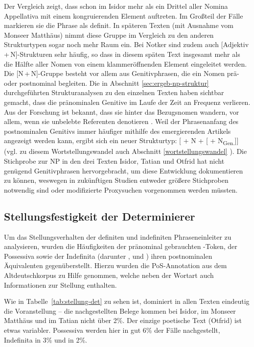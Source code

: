 Der Vergleich zeigt, dass schon im Isidor mehr als ein Drittel aller Nomina Appellativa mit einem kongruierenden Element auftreten. Im Großteil der Fälle markieren sie die Phrase als definit. In späteren Texten (mit Ausnahme vom Monseer Matthäus) nimmt diese Gruppe im Vergleich zu den anderen Strukturtypen sogar noch mehr Raum ein. Bei Notker sind zudem auch [Adjektiv\,+\,N]-Strukturen sehr häufig, so dass in diesem späten Text insgesamt mehr als die Hälfte aller Nomen von einem  klammeröffnenden Element eingeleitet werden. Die [N\,+\,N]-Gruppe besteht vor allem aus Genitivphrasen, die ein Nomen prä- oder postnominal begleiten. Die in Abschnitt \ref{sec:ergeb-np-struktur} durchgeführten Strukturanalysen zu den einzelnen Texten haben sichtbar gemacht, dass die pränominalen Genitive im Laufe der Zeit an Frequenz verlieren. Aus der Forschung ist bekannt, dass sie hinter das Bezugsnomen wandern, vor allem, wenn sie unbelebte Referenten denotieren \parencite{Demske2001}. Weil der Phrasenanfang des postnominalen Genitivs immer häufiger mithilfe des emergierenden Artikels angezeigt werden kann, ergibt sich ein neuer Strukturtyp: [ + N + [ + N\textsubscript{Gen.}]] (vgl. zu diesem Wortstellungswandel auch Abschnitt \ref{wortstellungswandel} ). Die Stichprobe zur NP in den drei Texten Isidor, Tatian und Otfrid hat nicht genügend Genitivphrasen hervorgebracht, um diese Entwicklung dokumentieren zu können, weswegen in zukünftigen Studien entweder größere Stichproben notwendig sind oder modifizierte Proxysuchen vorgenommen werden müssten.   


\subsection{Stellungsfestigkeit der Determinierer} \label{sec:ergebnisse-stellung}

Um das Stellungsverhalten der definiten und indefiniten Phraseneinleiter zu analysieren, wurden die Häufigkeiten der pränominal gebrauchten -Token, der Possessiva sowie der Indefinita (darunter ,  und ) ihren postnominalen Äquivalenten gegenüberstellt. Hierzu wurden die PoS-Annotation aus dem Altdeutschkorpus zu Hilfe genommen, welche neben der Wortart auch Informationen zur Stellung enthalten. 

Wie in Tabelle~\ref{tab:stellung-det} zu sehen ist, dominiert in allen Texten eindeutig die Voranstellung -- die nachgestellten Belege kommen bei Isidor, im Monseer Matthäus und im Tatian nicht über 2\%. Der einzige poetische Text (Otfrid) ist etwas variabler. Possessiva werden hier in gut 6\% der Fälle nachgestellt, Indefinita in 3\% und  in 2\%. 

